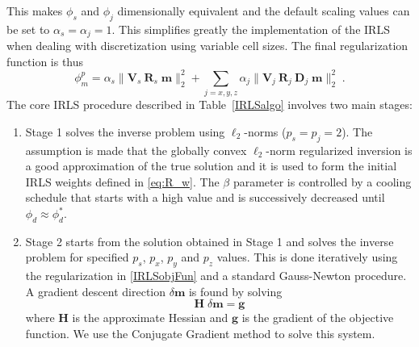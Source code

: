 \documentclass[extra,referee]{gji}
\begin{document}
This makes $\phi_s$ and $\phi_j$ dimensionally equivalent and the default scaling values can be set to $\alpha_s=\alpha_j=1$. This simplifies greatly the implementation of the IRLS when dealing with discretization using variable cell sizes.
The final regularization function is thus
\begin{equation}\label{IRLSobjFun}
\phi_m^p =\alpha_s \| \mathbf{V}_s\:\mathbf{R}_s\;\mathbf{m}\|_2^2 + \sum_{j=x,y,z} \alpha_j\|\mathbf{V}_j\:\mathbf{R}_j\:\mathbf{D}_j\;\mathbf{m}\|_2^2 \;.
\end{equation}
The core IRLS procedure described in Table~\ref{IRLSalgo} involves two main stages:
\begin{enumerate}
\item Stage 1 solves the inverse problem using $\ell_2$-norms ($p_s=p_j=2$). The assumption is made that the globally convex $\ell_2$-norm regularized inversion is a good approximation of the true solution and it is used to form the initial IRLS weights defined in \eqref{eq:R_w}. The $\beta$ parameter is controlled by a cooling schedule that starts with a high value and is successively decreased until $\phi_d \approx \phi_d^*$.

\item Stage 2 starts from the solution obtained in Stage 1 and solves the inverse problem for specified $p_s$, $p_x$, $p_y$ and $p_z$ values. This is done iteratively using the regularization in \eqref{IRLSobjFun} and a standard Gauss-Newton procedure. A gradient descent direction $\delta \mathbf{m}$ is found by solving
\begin{equation}\label{GaussNewtStep}
\mathbf{H}\; \delta \mathbf{m} = \mathbf{g}
\end{equation}
where $\mathbf{H}$ is the approximate Hessian and $\mathbf{g}$ is the gradient of the objective function. We use the Conjugate Gradient method \cite[]{HestenesStiefel1952} to solve this system.
\end{enumerate}
\end{document}
